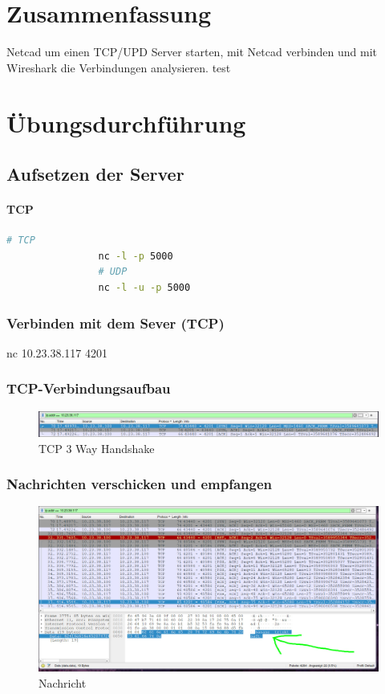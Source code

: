 \documentclass[a4paper]{article}
\begin{document}
\section{Zusammenfassung}
Netcad um einen TCP/UPD Server starten, mit Netcad verbinden und mit Wireshark die Verbindungen analysieren.
test


\newpage

\section{Übungsdurchführung}

\subsection{Aufsetzen der Server}
\paragraph{TCP}
\begin{lstlisting}[language=bash,caption={Commands}]
				# TCP
				nc -l -p 5000
				# UDP
				nc -l -u -p 5000
\end{lstlisting}

\subsubsection{Verbinden mit dem Sever (TCP)}
nc 10.23.38.117 4201
\subsubsection{TCP-Verbindungsaufbau}
\begin{figure}[h]
	\includegraphics[scale=0.3]{images/handshake.jpeg}
	\caption{TCP 3 Way Handshake}
\end{figure}
\subsubsection{Nachrichten verschicken und empfangen}
\begin{figure}[h]
	\includegraphics[scale=0.3]{images/nachricht.jpeg}
	\caption{Nachricht}
\end{figure}
\newpage
\end{document}
